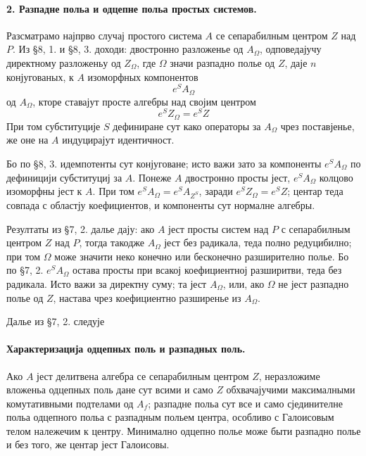 ﻿\documentclass[11pt]{article}
\begin{document}
\paragraph{2. Разпадне польа и одцепне польа простых системов.}
Разсматрамо најпрво случај простого система \(A\) се сепарабилным центром \(Z\) над \(P\). Из §8, 1. и §8, 3. доходи: двостронно разложенье од \(A_\Omega\), одповедајучу директному разложеньу од \(Z_\Omega\), где \(\Omega\) значи разпадно полье од \(Z\), даје \(n\) конјугованых, к \(A\) изоморфных компонентов
\[
        e^S A_\Omega
\]
од \(A_\Omega\), кторе ставајут просте алгебры над својим центром
\[
        e^S Z_\Omega=e^S Z
\]
При том субституције \(S\) дефиниране сут како операторы за \(A_\Omega\) чрез поставјенье, же оне на \(A\) индуцирајут идентичност.

Бо по §8, 3. идемпотенты сут конјуговане; исто важи зато за компоненты \(e^S A_\Omega\) по дефиницији субституциј за \(A\). Понеже \(A\) двостронно просты јест, \(e^S A_\Omega\) колцово изоморфны јест к \(A\). При том \(e^SA_\Omega=e^S A_{Z^{S}}\), заради \(e^S Z_\Omega=e^S Z\); центар теда совпада с областју коефициентов, и компоненты сут нормалне алгебры.

Резултаты из §7, 2. далье дају: ако \(A\) јест просты систем над \(P\) с сепарабилным центром \(Z\) над \(P\), тогда такодже \(A_\Omega\) јест без радикала, теда полно редуцибилно; при том \(\Omega\) може значити неко конечно или бесконечно разширително полье. Бо по §7, 2. \(e^S A_\Omega\) остава просты при всакој коефициентној разширитви, теда без радикала. Исто важи за директну суму; та јест \(A_\Omega\), или, ако \(\Omega\) не јест разпадно полье од \(Z\), настава чрез коефициентно разширенье из \(A_\Omega\).

Далье из §7, 2. следује

\paragraph{Характеризација одцепных поль и разпадных поль.}
Ако \(A\) јест делитвена алгебра се сепарабилным центром \(Z\), неразложиме вложеньа одцепных поль дане сут всими и само \(Z\) обхвачајучими максималными комутативными подтелами од \(A_f\); разпадне польа сут все и само сјединителне польа одцепного польа с разпадным польем центра, особливо с Галоисовым телом належечим к центру. Минимално одцепно полье може быти разпадно полье и без того, же центар јест Галоисовы.
\end{document}
